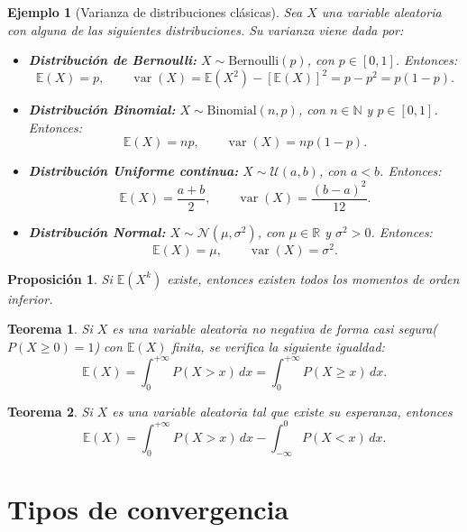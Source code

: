\documentclass{report}
\newtheorem{thm}{Teorema}[section]
\newtheorem{prop}{Proposición}[section]
\newtheorem{ej}{Ejemplo}[section]
\begin{document}
\begin{ej}[Varianza de distribuciones clásicas]
Sea \( X \) una variable aleatoria con alguna de las siguientes distribuciones. Su varianza viene dada por:

\begin{itemize}
    \item \textbf{Distribución de Bernoulli:} \( X \sim \mathrm{Bernoulli}(p) \), con \( p \in [0,1] \). Entonces:
    \[
    \mathbb{E}(X) = p, \qquad \operatorname{var}(X) = \mathbb{E}(X^2) - [\mathbb{E}(X)]^2 = p - p^2 = p(1 - p).
    \]

    \item \textbf{Distribución Binomial:} \( X \sim \mathrm{Binomial}(n, p) \), con \( n \in \mathbb{N} \) y \( p \in [0,1] \). Entonces:
    \[
    \mathbb{E}(X) = np, \qquad \operatorname{var}(X) = np(1 - p).
    \]

    \item \textbf{Distribución Uniforme continua:} \( X \sim \mathcal{U}(a, b) \), con \( a < b \). Entonces:
    \[
    \mathbb{E}(X) = \frac{a + b}{2}, \qquad \operatorname{var}(X) = \frac{(b - a)^2}{12}.
    \]

    \item \textbf{Distribución Normal:} \( X \sim \mathcal{N}(\mu, \sigma^2) \), con \( \mu \in \mathbb{R} \) y \( \sigma^2 > 0 \). Entonces:
    \[
    \mathbb{E}(X) = \mu, \qquad \operatorname{var}(X) = \sigma^2.
    \]
\end{itemize}
\end{ej}

\begin{prop}
Si \( \mathbb{E}(X^k) \) existe, entonces existen todos los momentos de orden inferior.
\end{prop}

\begin{thm}
Si \( X \) es una variable aleatoria no negativa de forma casi segura\footnotemark[1]  (\( P(X\geq0)=1 \))
con \( \mathbb{E}(X) \) finita, se verifica la siguiente igualdad:
\[
\mathbb{E}(X) = \int_0^{+\infty} P(X > x)\,dx = \int_0^{+\infty} P(X \geq x)\,dx.
\]
\end{thm}
\begin{thm}
Si \( X \) es una variable aleatoria tal que existe su esperanza, entonces
\[
\mathbb{E}(X) = \int_0^{+\infty} P(X > x)\, dx - \int_{-\infty}^0 P(X < x)\, dx.
\]
\end{thm}

\section{Tipos de convergencia}
\end{document}
